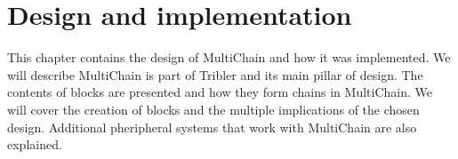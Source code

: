 \chapter{Design and implementation}
This chapter contains the design of MultiChain and how it was implemented.
We will describe MultiChain is part of Tribler and its main pillar of design.
The contents of blocks are presented and how they form chains in MultiChain.
We will cover the creation of blocks and the multiple implications of the chosen design.
Additional pheripheral systems that work with MultiChain are also explained.










